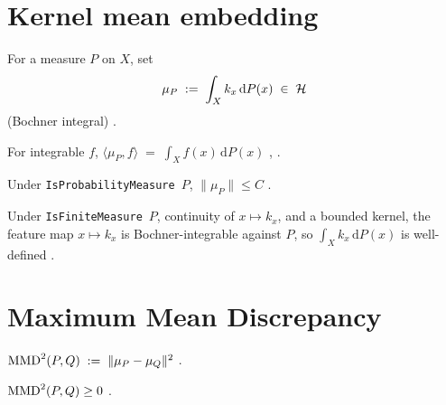 \section{Kernel mean embedding}\label{sec:kme}

\begin{defn}
\label{def:kme}
  \leanok
For a measure $P$ on $X$, set
\[
  \mu_P \;:=\; \int_X k_x \,\mathrm{d}P(x) \;\in\; \mathcal{H}
\]
(Bochner integral) \cite{smola2007kme}.
\end{defn}

\begin{thm}
\label{thm:kme-reproducing}
  \leanok
For integrable $f$,
$\langle \mu_P, f \rangle \;=\; \int_X f(x) \,\mathrm{d}P(x)$
\cite[eq.~(4)]{smola2007kme}, \cite[\S2, eq.~(2)]{gretton2012kernel}.
\end{thm}

\begin{thm}
\label{thm:kme-norm-bound}
  \leanok
Under \texttt{IsProbabilityMeasure}~$P$, $\|\mu_P\| \le C$
\cite[Lemma~4]{gretton2012kernel}.
\end{thm}

\begin{thm}
\label{thm:kme-integrable}
  \leanok
Under \texttt{IsFiniteMeasure}~$P$, continuity of $x \mapsto k_x$,
and a bounded kernel, the feature map $x \mapsto k_x$ is
Bochner-integrable against $P$, so
$\int_X k_x \,\mathrm{d}P(x)$ is well-defined
\cite[\S2]{gretton2012kernel}.
\end{thm}

\section{Maximum Mean Discrepancy}\label{sec:mmd}

\begin{defn}
\label{def:mmd-sq}
  \leanok
$\mathrm{MMD}^2(P, Q) \;:=\; \| \mu_P - \mu_Q \|^2$ \cite[Defn.\ 2]{gretton2012kernel}.
\end{defn}

\begin{thm}
\label{thm:mmd-sq-nonneg}
  \leanok
$\mathrm{MMD}^2(P, Q) \ge 0$ \cite[Lemma~5]{gretton2012kernel}.
\end{thm}

